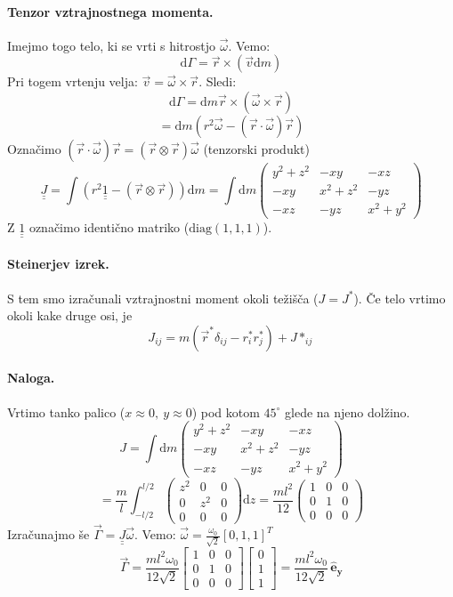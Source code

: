 \documentclass[a4paper]{article}
\newcommand{\vct}[1]{\overrightarrow{#1}}
\newcommand{\dif}{\mathrm{d}}
\newcommand{\vr}{\vct{r}}
\newcommand{\vv}{\vct{v}}
\newcommand{\vw}{\vct{\omega}}
\newcommand{\duline}[1]{\underline{\underline{#1}}}
\begin{document}
\paragraph{Tenzor vztrajnostnega momenta.} Imejmo togo telo, ki se vrti s hitrostjo $\vw$. Vemo: $$\dif\Gamma = \vr \times(\vv\dif m)$$
Pri togem vrtenju velja: $\vv = \vw\times\vr$. Sledi:
$$\dif\Gamma = \dif m \vr \times (\vw \times \vr)$$
$$= \dif m \left(r^2\vw - (\vr\cdot\vw)\vr\right)$$
Označimo $(\vr\cdot\vw)\vr = (\vr\otimes\vr)\vw$ (tenzorski produkt)
$$\duline{J} = \int (r^2 \duline{1} - (\vr \otimes \vr)) \dif m = \int \dif m \begin{pmatrix}
    y^2 + z^2 & -xy & -xz \\
    -xy & x^2 + z^2 & -yz \\
    -xz & -yz & x^2 + y^2
\end{pmatrix}$$
Z $\duline{1}$ označimo identično matriko ($\mathrm{diag}(1, 1, 1)$).
\paragraph{Steinerjev izrek.} S tem smo izračunali vztrajnostni moment okoli težišča ($J = J^*$). Če telo vrtimo okoli kake druge osi, je
$$J_{ij} = m(\vr^*\delta_{ij} - r_i^*r_j^*) + J*_{ij}$$
\paragraph{Naloga.} Vrtimo tanko palico ($x \approx 0,~y\approx 0$) pod kotom $45^\circ$ glede na njeno dolžino.
$$J = \int \dif m \begin{pmatrix}
    y^2 + z^2 & -xy & -xz \\
    -xy & x^2 + z^2 & -yz \\
    -xz & -yz & x^2 + y^2
\end{pmatrix}$$
$$= \frac{m}{l}\int_{-l/2}^{l/2}\begin{pmatrix}
    z^2 & 0 & 0 \\
    0 & z^2 & 0 \\
    0 & 0 & 0
\end{pmatrix} \dif z = \frac{ml^2}{12}\begin{pmatrix}
    1 & 0 & 0 \\
    0 & 1 & 0 \\
    0 & 0 & 0
\end{pmatrix}$$
Izračunajmo še $\vct{\Gamma} = \duline{J}\vw$.
Vemo: $\displaystyle{\vw = \frac{\omega_0}{\sqrt{2}}\left[0, 1, 1\right]^T}$
$$\vct{\Gamma} = \frac{ml^2\omega_0}{12\sqrt{2}}\begin{bmatrix}
    1 & 0 & 0 \\
    0 & 1 & 0 \\
    0 & 0 & 0
\end{bmatrix}\begin{bmatrix}
    0 \\ 1 \\ 1
\end{bmatrix} = \frac{ml^2\omega_0}{12\sqrt{2}}\,\mathbf{\hat{e}_y}$$
\end{document}
